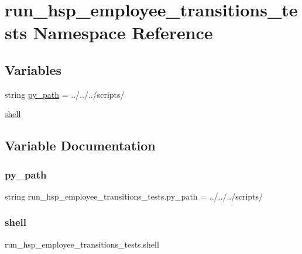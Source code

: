 \hypertarget{namespacerun__hsp__employee__transitions__tests}{}\section{run\+\_\+hsp\+\_\+employee\+\_\+transitions\+\_\+tests Namespace Reference}
\label{namespacerun__hsp__employee__transitions__tests}
\subsection*{Variables}
\begin{DoxyCompactItemize}
\item 
string \hyperlink{namespacerun__hsp__employee__transitions__tests_ad98cf5441b991f0121fd822c5c87447c}{py\+\_\+path} = \textquotesingle{}../../../scripts/\textquotesingle{}
\item 
\hyperlink{namespacerun__hsp__employee__transitions__tests_a324a03e0373bd8399805cdf19df11c4d}{shell}
\end{DoxyCompactItemize}


\subsection{Variable Documentation}
\mbox{\label{namespacerun__hsp__employee__transitions__tests_ad98cf5441b991f0121fd822c5c87447c}} 
\subsubsection{\texorpdfstring{py\+\_\+path}{py\_path}}
{\footnotesize\ttfamily string run\+\_\+hsp\+\_\+employee\+\_\+transitions\+\_\+tests.\+py\+\_\+path = \textquotesingle{}../../../scripts/\textquotesingle{}}

\mbox{\label{namespacerun__hsp__employee__transitions__tests_a324a03e0373bd8399805cdf19df11c4d}} 
\subsubsection{\texorpdfstring{shell}{shell}}
{\footnotesize\ttfamily run\+\_\+hsp\+\_\+employee\+\_\+transitions\+\_\+tests.\+shell}


